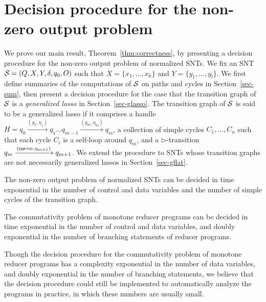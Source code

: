 
\section{Decision procedure for the non-zero output problem}\label{sec:dec-snt}
%
We prove our main result, Theorem~\ref{thm:correctness}, by presenting a decision procedure for the non-zero output problem of normalized SNTs. We fix an SNT ${\mathcal{S} } = (Q,X,Y,\delta,q_0,O)$ such that $X=\{ x_1,\dots, x_k\}$ and $Y = \{y_1,\dots,y_l\}$. 
We first define summaries of the computations of ${\mathcal{S} }$ on paths and cycles in Section~\ref{sec-sum}, then present a decision procedure for the case that the transition graph of ${\mathcal{S} }$ is a \emph{generalized lasso} in Section~\ref{sec-glasso}. The transition graph of ${\mathcal{S} }$ is said to be a generalized lasso if it comprises a handle $H=q_0 \xrightarrow{(g_1,\eta_1)} q_1 \dots q_{m-1} \xrightarrow{(g_m,\eta_m)} q_{m}$, a collection of simple cycles $C_1,\dots,C_n$ such that each cycle $C_i$ is a self-loop around $q_m$, and a $\triangleright$-transition $q_m \xrightarrow{(\mathsf{cur} = \triangleright, \eta_{m+1})} q_{m+1}$. We extend the procedure to SNTs whose transition graphs are not necessarily generalized lassos in Section~\ref{sec-gflat}. 


\begin{theorem}\label{thm:correctness}
The non-zero output problem of normalized SNTs can be decided in time exponential in the number of control and data variables and the number of simple cycles of the transition graph.
\end{theorem}

\begin{corollary}\label{cor:snt-dec-proc}
The commutativity problem of  monotone reducer programs can be decided in time exponential in the number of control and data variables, and doubly exponential in the number of branching statements of reducer programs. 
\end{corollary}

\begin{remark}
Though the decision procedure for the commutativity problem of monotone reducer programs has a complexity exponential in the number of data variables, and doubly exponential in the number of branching statements, we believe that the decision procedure could still be implemented to automatically analyze the programs in practice, in which these numbers are usually small. 
\end{remark}



\vspace{-2mm}


\vspace{-4mm}
